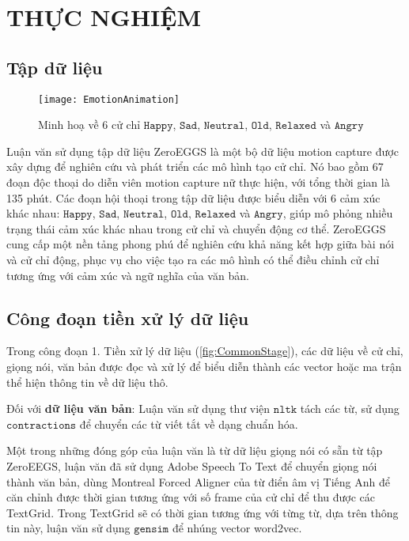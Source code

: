 \chapter{THỰC NGHIỆM}
\label{Chapter4}

\section{Tập dữ liệu}

\begin{figure}[H]
	\centering
	\texttt{[image: EmotionAnimation]}
	\caption{Minh hoạ về 6 cử chỉ $\texttt{Happy}$, $\texttt{Sad}$, $\texttt{Neutral}$, $\texttt{Old}$, $\texttt{Relaxed}$ và $\texttt{Angry}$}
\end{figure}

Luận văn sử dụng tập dữ liệu ZeroEGGS \cite{ghorbani2022zeroeggszeroshotexamplebasedgesture} là một bộ dữ liệu motion capture được xây dựng để nghiên cứu và phát triển các mô hình tạo cử chỉ. Nó bao gồm 67 đoạn độc thoại do diễn viên motion capture nữ thực hiện, với tổng thời gian là 135 phút. Các đoạn hội thoại trong tập dữ liệu được biểu diễn với 6 cảm xúc khác nhau: $\texttt{Happy}$, $\texttt{Sad}$, $\texttt{Neutral}$, $\texttt{Old}$, $\texttt{Relaxed}$ và $\texttt{Angry}$, giúp mô phỏng nhiều trạng thái cảm xúc khác nhau trong cử chỉ và chuyển động cơ thể. ZeroEGGS cung cấp một nền tảng phong phú để nghiên cứu khả năng kết hợp giữa bài nói và cử chỉ động, phục vụ cho việc tạo ra các mô hình có thể điều chỉnh cử chỉ tương ứng với cảm xúc và ngữ nghĩa của văn bản.

\section{Công đoạn tiền xử lý dữ liệu}
\label{sec:Preprocessing}

Trong công đoạn {1. Tiền xử lý dữ liệu} (\autoref{fig:CommonStage}), các dữ liệu về cử chỉ, giọng nói, văn bản được đọc và xử lý để biểu diễn thành các vector hoặc ma trận thể hiện thông tin về dữ liệu thô.

Đối với \textbf{dữ liệu văn bản}: Luận văn sử dụng thư viện $\texttt{nltk}$ tách các từ, sử dụng $\texttt{contractions}$ để chuyển các từ viết tắt về dạng chuẩn hóa.

Một trong những đóng góp của luận văn là từ dữ liệu giọng nói có sẵn từ tập ZeroEEGS, luận văn đã sử dụng Adobe Speech To Text để chuyển giọng nói thành văn bản, dùng Montreal Forced Aligner \cite{saxon2020robust} của từ điển âm vị Tiếng Anh để căn chỉnh được thời gian tương ứng với số frame của cử chỉ để thu được các TextGrid. Trong TextGrid sẽ có thời gian tương ứng với từng từ, dựa trên thông tin này, luận văn sử dụng  $\texttt{gensim}$ để nhúng vector word2vec.
 

